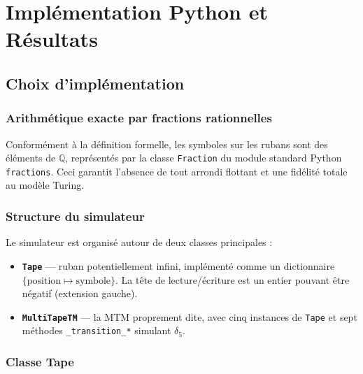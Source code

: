 \documentclass[12pt, a4paper, oneside]{report}
\begin{document}
\chapter{Implémentation Python et Résultats}

\section{Choix d'implémentation}

\subsection{Arithmétique exacte par fractions rationnelles}

Conformément à la définition formelle, les symboles sur les rubans sont des éléments de $\mathbb{Q}$, représentés par la classe \texttt{Fraction} du module standard Python \texttt{fractions}. Ceci garantit l'absence de tout arrondi flottant et une fidélité totale au modèle Turing.

\subsection{Structure du simulateur}

Le simulateur est organisé autour de deux classes principales :

\begin{itemize}
  \item \textbf{\texttt{Tape}} — ruban potentiellement infini, implémenté comme un dictionnaire $\{\text{position} \mapsto \text{symbole}\}$. La tête de lecture/écriture est un entier pouvant être négatif (extension gauche).
  \item \textbf{\texttt{MultiTapeTM}} — la MTM proprement dite, avec cinq instances de \texttt{Tape} et sept méthodes \texttt{\_transition\_*} simulant $\delta_5$.
\end{itemize}

\subsection{Classe Tape}
\end{document}

